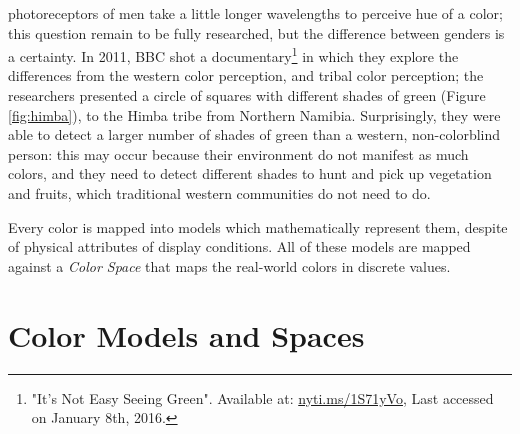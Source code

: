 \documentclass{report}
\begin{document}
photoreceptors of men take a little longer wavelengths to perceive hue of a color; this question remain
to be fully researched, but the difference between genders is a certainty. In 2011, BBC shot a
documentary\footnote{\label{itsnoteasy}"It's Not Easy Seeing Green". Available at:
{\url {nyti.ms/1S71yVo}},
Last accessed on January 8th, 2016.} in which they explore the differences from the western color
perception, and tribal color perception; the researchers presented a circle of squares with different
shades of green (Figure \ref{fig:himba}), to the Himba tribe from Northern Namibia. Surprisingly, they were able to detect a larger
number of shades of green than a western, non-colorblind person: this may occur because their environment do not
manifest as much colors, and they need to detect different shades to hunt and pick up vegetation and
fruits, which traditional western communities do not need to do. \\
\par
Every color is mapped into models which mathematically represent them, despite of physical attributes of display conditions.
All of these models are mapped against a \emph{Color Space} that maps the real-world colors in discrete values.
%
\section{Color Models and Spaces}
\end{document}
